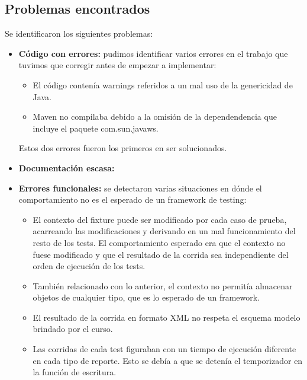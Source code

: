 \documentclass[12pt]{article}
\begin{document}
\subsection{Problemas encontrados}
Se identificaron los siguientes problemas:

\begin{itemize}
	\item \textbf{Código con errores:} pudimos identificar varios errores en el trabajo que tuvimos que
		corregir antes de empezar a implementar:
		
		\begin{itemize}
			\item El código contenía warnings referidos a un mal uso de la genericidad de Java.
			
			\item Maven no compilaba debido a la omisión de la dependendencia que incluye el paquete 
				com.sun.javaws.
				
		\end{itemize}
		
		Estos dos errores fueron los primeros en ser solucionados.
		
	\item \textbf{Documentación escasa:} 
		
	\item \textbf{Errores funcionales:} se detectaron varias situaciones en dónde el comportamiento
		no es el esperado de un framework de testing:
		
		\begin{itemize}
			\item El contexto del fixture puede ser modificado por cada caso de prueba, acarreando las
				modificaciones y derivando en un mal funcionamiento del resto de los tests.
				El comportamiento esperado era que el contexto no fuese modificado y que el
				resultado de la corrida sea independiente del orden de ejecución de los tests.

			\item También relacionado con lo anterior, el contexto no permitía almacenar objetos de cualquier 
				tipo, que es lo esperado de un framework.
				
			\item El resultado de la corrida en formato XML no respeta el esquema modelo brindado por 
				el curso.
				
			\item Las corridas de cada test figuraban con un tiempo de ejecución diferente en cada
				tipo de reporte. Esto se debía a que se detenía el temporizador en la función de
				escritura.


\end{itemize}
\end{itemize}
\end{document}
